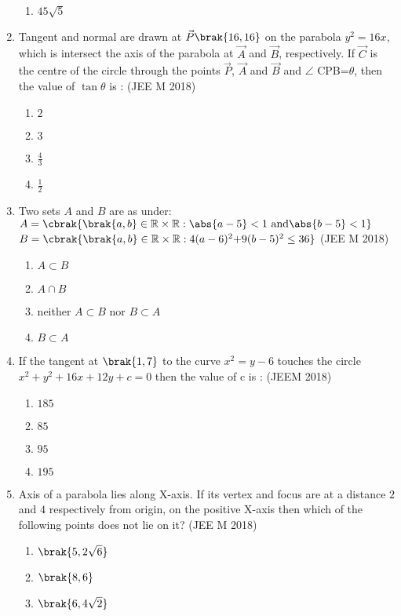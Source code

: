 \begin{enumerate}
\begin{enumerate}
     		\item $45\sqrt5$
	\end{enumerate}
\item Tangent and normal are drawn at $\vec{P}\brak{16,16}$ on the parabola $y^2=16x$,
which is intersect the axis of the parabola at $\vec{A}$ and $\vec{B}$, respectively. If $\vec{C}$ is the centre of the circle through the points $\vec{P}$, $\vec{A}$ and $\vec{B}$ and $\angle$ CPB=$\theta$, then the value of $\tan{\theta}$ is :
     \hfill{(JEE M 2018)}
	\begin{enumerate}
    		\item $2$
    		\item $3$
    		\item $\frac{4}{3}$
    		\item $\frac{1}{2}$
	\end{enumerate}
\item  Two sets $A$ and $B$ are as under:
$A=\cbrak{\brak{a,b}\in\mathbb{R}\times\mathbb{R}:\abs{a-5}<1\text{ and} \abs{b-5}<1}$
$B=\cbrak{\brak{a,b}\in\mathbb{R}\times\mathbb{R}:4(a-6)^2\text{+}9(b-5)^2\leq36}$
    \hfill{(JEE M 2018)}
	\begin{enumerate}
		\item $A\subset B$ 
		\item $A\cap B$
		\item neither $A\subset B$ nor $B\subset A$
		\item $B\subset A$
	\end{enumerate}
\item If the tangent at $\brak{1,7}$ to the curve $x^2=y-6$ touches the circle $x^2+y^2+16x+12y+c=0$ then the value of c is :
       \hfill{(JEEM 2018)}
	\begin{enumerate}
    		\item $185$
    		\item $85$
    		\item $95$
    		\item $195$
	\end{enumerate} 
\item Axis of a parabola lies along X-axis. If its vertex and focus are at a distance $2$ and $4$ respectively from origin, on the positive X-axis then which of the following points does not lie on it? 
     \hfill{(JEE M 2018)} 
	\begin{enumerate}
    		\item $\brak{5,2\sqrt6}$
    		\item $\brak{8,6}$
    		\item $\brak{6,4\sqrt2}$

\end{enumerate}
\end{enumerate}
